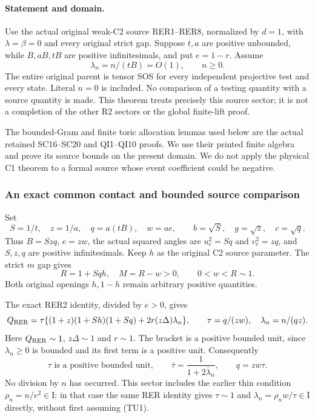 \label{pb88ccd68a4bf:sec:r2-thin-new}

\paragraph{Statement and domain.}
Use the actual original weak-C2 source RER1--RER8, normalized by
$d=1$, with $\lambda=\beta=0$ and every original strict gap.
Suppose $t,a$ are positive unbounded, while $B,aB,tB$ are
positive infinitesimals, and put $e=1-r$.  Assume
\[
             \lambda_n=n/(tB)=O(1),\qquad n\geq0.       \tag{TU1}
\]
The entire original parent is tensor SOS for every independent
projective test and every state.  Literal $n=0$ is included.
No comparison of a testing quantity with a source quantity is made.
This theorem treats precisely this source sector; it is not a
completion of the other R2 sectors or the global finite-lift proof.

The bounded-Gram and finite toric allocation lemmas used below are
the actual retained SC16--SC20 and QI1--QI10 proofs.  We use their
printed finite algebra and prove its source bounds on the present
domain.  We do not apply the physical C1 theorem to a formal source
whose event coefficient could be negative.

\subsubsection*{An exact common contact and bounded source comparison}

Set
\[
 S=1/t,\quad z=1/a,\quad q=a(tB),\quad w=ae,\qquad
 b=\sqrt S,\quad g=\sqrt z,\quad c=\sqrt q.
                                                               \tag{TU2}
\]
Thus $B=Szq$, $e=zw$, the actual squared angles are
$u_c^2=Sq$ and $v_c^2=zq$, and $S,z,q$ are positive
infinitesimals.  Keep $h$ as the original C2 source parameter.
The strict $m$ gap gives
\[
 R=1+Sqh,\quad M=R-w>0,
 \qquad 0<w<R\sim1.                                      \tag{TU3}
\]
Both original openings $h,1-h$ remain arbitrary positive quantities.

The exact RER2 identity, divided by $e>0$, gives
\[
 Q_{\rm RER}
 =\tau\{(1+z)(1+Sh)(1+Sq)+2r(z\Delta)\lambda_n\},
 \qquad \tau=q/(zw),\quad \lambda_n=n/(qz).
\]
Here $Q_{\rm RER}\sim1$, $z\Delta\sim1$ and $r\sim1$.
The bracket is a positive bounded unit, since $\lambda_n\geq0$
is bounded and its first term is a positive unit.  Consequently
\[
 \tau\text{ is a positive bounded unit},\qquad
 \overline\tau=\frac1{1+2\overline\lambda_n},\qquad
 q=zw\tau.
                                                               \tag{TU4}
\]
No division by $n$ has occurred.  This sector includes the earlier
thin condition $\rho_n=n/e^2\in\mathrm I$: in that case the same
RER identity gives $\tau\sim1$ and
$\lambda_n=\rho_nw/\tau\in\mathrm I$ directly, without first
assuming (TU1).

